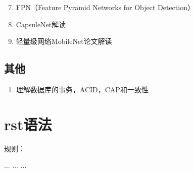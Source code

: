 \documentclass[letterpaper,10pt,english]{sphinxmanual}
\begin{document}
\begin{enumerate}
\setcounter{enumi}{6}
\item {} 
FPN（Feature Pyramid Networks for Object Detection）

\end{enumerate}
\begin{quote}

\end{quote}
\begin{enumerate}
\setcounter{enumi}{7}
\item {} 
CapsuleNet解读

\end{enumerate}
\begin{quote}

\end{quote}
\begin{enumerate}
\setcounter{enumi}{8}
\item {} 
轻量级网络\textendash{}MobileNet论文解读

\end{enumerate}
\begin{quote}

\end{quote}


\subsection{其他}
\label{\detokenize{else/01_interview:id6}}\begin{enumerate}
\item {} 
理解数据库的事务，ACID，CAP和一致性

\end{enumerate}
\begin{quote}

\end{quote}


\section{rst语法}
\label{\detokenize{else/02_test_code:rst}}\label{\detokenize{else/02_test_code::doc}}
 规则：

%
\begin{sphinxVerbatim}[commandchars=\\\{\}]
  ...
    ...
    ...
\end{sphinxVerbatim}
\end{document}
